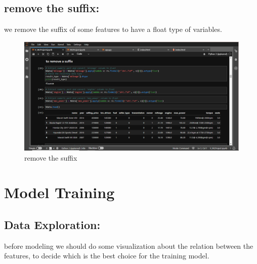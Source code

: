 \documentclass{article}
\begin{document}
\subsection{remove the suffix:}
we remove the suffix of some features to have a float type of variables.

\begin{figure}[!h]
    \centering
    \includegraphics[width=1\textwidth]{rm-sufix.png}
    \caption{remove the suffix}
    \label{fig:my_label}
\end{figure}

\section{Model Training}
\subsection{Data Exploration:}
before modeling we should do some visualization about the relation between the features, to decide which is the best choice for the training model.\\
\end{document}
